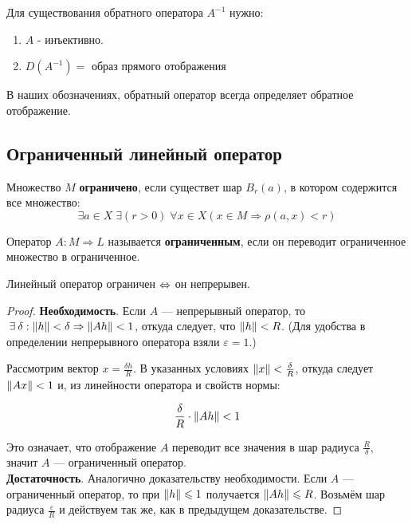 \documentclass[12pt]{article}
\begin{document}
	Для существования обратного оператора $A^{-1}$ нужно:
	\begin{enumerate}
		\item $A$ - инъективно.
		\item $D(A^{-1}) = $ образ прямого отображения
	\end{enumerate}
	В наших обозначениях, обратный оператор всегда определяет обратное отображение. 

	\subsection{Ограниченный линейный оператор}	
	
		\begin{defi}
			Множество $M$ \textbf{ограничено}, если существет шар $B_r(a)$, в котором содержится все множество:
			$$ \exists a \in X \; \exists (r > 0) \; \forall x \in X (x \in M \Rightarrow \rho(a, x) < r) $$
		\end{defi}
		\begin{defi}
			Оператор $A: M \Rightarrow L$ называется \textbf{ограниченным}, если он переводит ограниченное множество
			в ограниченное.
		\end{defi}
	
		\begin{state}
			Линейный оператор ограничен $\Leftrightarrow$ он непрерывен.
		\end{state}
		\begin{proof}
			\textbf{Необходимость}. Если $A$ --- непрерывный оператор, то 
			$ \exists \delta : \norm{h} < \delta \Rightarrow \norm{Ah} < 1 $,
			откуда следует, что $\left\| h \right\| < R$. (Для удобства в определении 
			непрерывного оператора взяли $\varepsilon = 1$.)
		
			Рассмотрим вектор $x = \frac{\delta h}{R}$. В указанных условиях
			$\left\| x \right\| < \frac{\delta}{R}$, откуда следует $\left\| Ax \right\| < 1$ и, из линейности оператора и свойств нормы:

			$$\frac{\delta}{R} \cdot \left\| Ah \right\| < 1$$
		
			Это означает, что отображение $A$ переводит все значения в шар радиуса $\frac{R}{\delta}$, значит
			$A$ --- ограниченный оператор. \\
		
			\textbf{Достаточность}. Аналогично доказательству необходимости. Если $A$ --- ограниченный оператор,
			то при $\left\| h \right\| \leqslant 1$ получается $\left\| Ah \right\| \leqslant R$. Возьмём шар радиуса $\frac{\varepsilon}{R}$
			и действуем так же, как в предыдущем доказательстве.
		\end{proof}
	
\end{document}
